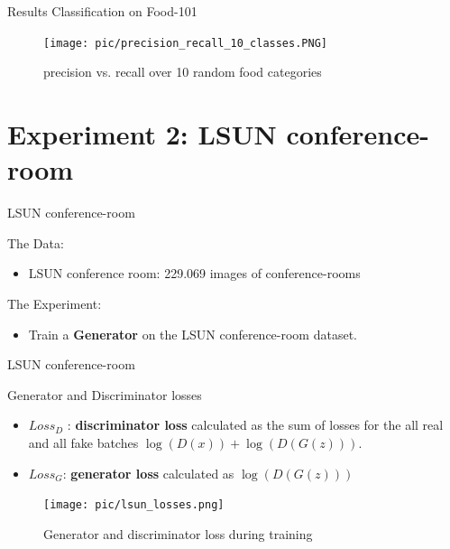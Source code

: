 \documentclass[10pt]{beamer}
\begin{document}
{
\begin{frame}{Results Classification on Food-101}
\begin{figure}[htbp] 
  \centering
     \texttt{[image: pic/precision\_recall\_10\_classes.PNG]}
  \caption{precision vs. recall over 10 random food categories }
  \label{fig:Bild1}
\end{figure}
\end{frame}
}

\section{Experiment 2: LSUN conference-room}

{
\begin{frame}{LSUN conference-room}
      \begin{block}{The Data:}
	\begin{itemize}
    \item LSUN conference room: 229.069 images of conference-rooms
  \end{itemize}
    \end{block}
        \begin{block}{The Experiment:}
	\begin{itemize}
	\item Train a \textbf{Generator} on the LSUN conference-room dataset. 
  \end{itemize}
    \end{block}
\end{frame}
}

{
\begin{frame}{LSUN conference-room}
      \begin{block}{Generator and Discriminator losses}
	\begin{itemize}[<+- | alert@+>]
    \item \textbf{$Loss_D$} : \textbf{discriminator loss} calculated as the sum of losses for the all real and all fake batches $ \log(D(x))+\log(D(G(z)))$.
    \item \textbf{$Loss_G$}: \textbf{generator loss} calculated as $\log(D(G(z)))$
  \end{itemize}
    \end{block}   
\begin{figure}[htbp] 
  \centering
     \texttt{[image: pic/lsun\_losses.png]}
  \caption{Generator and discriminator loss during training }
  \label{fig:Bild1}
\end{figure} 
\end{frame}
}
\end{document}

